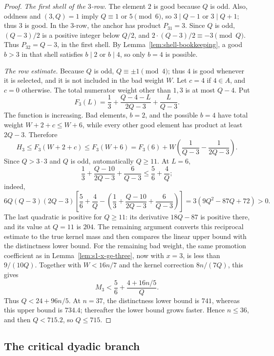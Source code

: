\documentclass[11pt]{article}
\theoremstyle{definition}
\theoremstyle{remark}
\begin{document}
\begin{proof}
\noindent\emph{The first shell of the \(3\)-row.}
The element \(2\) is good because \(Q\) is odd.  Also, oddness and
\((3,Q)=1\) imply \(Q\equiv1\) or \(5\pmod6\), so \(3\mid Q-1\) or
\(3\mid Q+1\); thus \(3\) is good.  In the \(3\)-row, the anchor has
product \(P_{31}=3\).  Since \(Q\) is odd, \((Q-3)/2\) is a positive
integer below \(Q/2\), and
\(2\cdot(Q-3)/2\equiv-3\pmod Q\).  Thus
\(P_{32}=Q-3\), in the first shell.  By
Lemma~\ref{lem:shell-bookkeeping}, a good \(b>3\) in that shell satisfies
\(b\mid2\) or \(b\mid4\), so only \(b=4\) is possible.

\smallskip
\noindent\emph{The row estimate.}
Because \(Q\) is odd, \(Q\equiv\pm1\pmod4\); thus \(4\) is good whenever
it is selected, and it is not included in the bad weight \(W\).  Let
\(c=4\) if \(4\in A\), and \(c=0\) otherwise.  The total numerator
weight other than \(1,3\) is at most \(Q-4\).  Put
\[
 F_3(L)=\frac13+\frac{Q-4-L}{2Q-3}+\frac{L}{Q-3}.
\]
The function is increasing.  Bad elements, \(b=2\), and the possible
\(b=4\) have total weight \(W+2+c\le W+6\), while every other good
element has product at least \(2Q-3\).  Therefore
\[
 H_3\le F_3(W+2+c)\le F_3(W+6)
 =F_3(6)+W\left(\frac1{Q-3}-\frac1{2Q-3}\right).
\]
Since \(Q>3\cdot3\) and \(Q\) is odd, automatically \(Q\ge11\).  At
\(L=6\),
\[
 \frac13+\frac{Q-10}{2Q-3}+\frac6{Q-3}
 \le\frac56+\frac4Q;
\]
indeed,
\[
 6Q(Q-3)(2Q-3)\left[
 \frac56+\frac4Q-
 \left(\frac13+\frac{Q-10}{2Q-3}+\frac6{Q-3}\right)\right]
 =3(9Q^2-87Q+72)>0.
\]
The last quadratic is positive for \(Q\ge11\): its derivative
\(18Q-87\) is positive there, and its value at \(Q=11\) is \(204\).
The remaining argument converts this reciprocal estimate to the true kernel
mass and then compares the linear upper bound with the distinctness lower
bound.
For the remaining bad weight, the same promotion
coefficient as in Lemma~\ref{lem:s1-x-ge-three}, now with \(x=3\), is less
than \(9/(10Q)\).  Together with \(W<16n/7\) and the kernel correction
\(8n/(7Q)\), this gives
\[
 M_3<\frac56+\frac{4+16n/5}{Q}.
\]
Thus \(Q<24+96n/5\).  At \(n=37\), the distinctness lower bound is
\(741\), whereas this upper bound is \(734.4\); thereafter the lower
bound grows faster.  Hence \(n\le36\), and then \(Q<715.2\), so
\(Q\le715\).
\end{proof}

\subsection{The critical dyadic branch}
\end{document}
